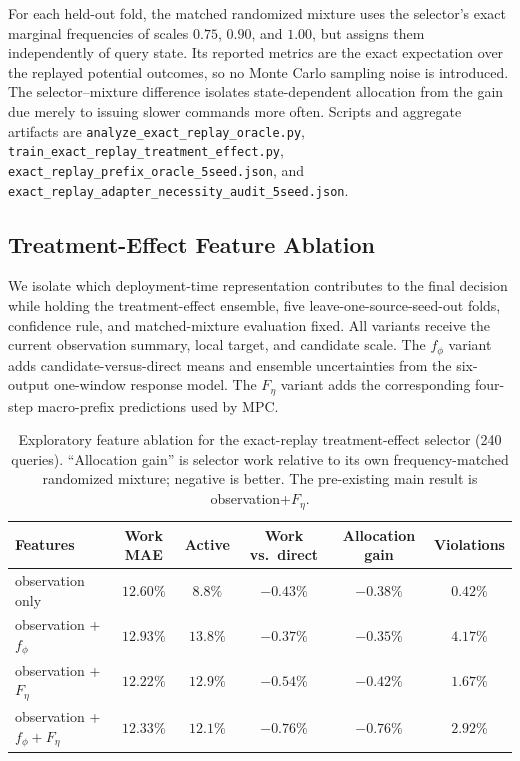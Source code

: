 For each held-out fold, the matched randomized mixture uses the selector's exact
marginal frequencies of scales $0.75$, $0.90$, and $1.00$, but assigns them
independently of query state. Its reported metrics are the exact expectation over
the replayed potential outcomes, so no Monte Carlo sampling noise is introduced.
The selector--mixture difference isolates state-dependent allocation from the
gain due merely to issuing slower commands more often. Scripts and aggregate
artifacts are
\texttt{analyze\_exact\_replay\_oracle.py},
\texttt{train\_exact\_replay\_treatment\_effect.py},
\texttt{exact\_replay\_prefix\_oracle\_5seed.json}, and
\texttt{exact\_replay\_adapter\_necessity\_audit\_5seed.json}.

\subsection{Treatment-Effect Feature Ablation}
\label{app:feature-ablation}

We isolate which deployment-time representation contributes to the final
decision while holding the treatment-effect ensemble, five leave-one-source-seed-out
folds, confidence rule, and matched-mixture evaluation fixed. All variants
receive the current observation summary, local target, and candidate scale.
The $f_\phi$ variant adds candidate-versus-direct means and ensemble
uncertainties from the six-output one-window response model. The $F_\eta$
variant adds the corresponding four-step macro-prefix predictions used by MPC.

\begin{table}[h]
\centering
\caption{Exploratory feature ablation for the exact-replay treatment-effect selector (240 queries). ``Allocation gain'' is selector work relative to its own frequency-matched randomized mixture; negative is better. The pre-existing main result is observation+$F_\eta$.}
\label{tab:feature-ablation}
\begin{tabular}{lccccc}
\toprule
Features & Work MAE & Active & Work vs.\ direct & Allocation gain & Violations \\
\midrule
observation only & $12.60\%$ & $8.8\%$ & $-0.43\%$ & $-0.38\%$ & $0.42\%$ \\
observation + $f_\phi$ & $12.93\%$ & $13.8\%$ & $-0.37\%$ & $-0.35\%$ & $4.17\%$ \\
observation + $F_\eta$ & $\mathbf{12.22\%}$ & $12.9\%$ & $-0.54\%$ & $-0.42\%$ & $1.67\%$ \\
observation + $f_\phi+F_\eta$ & $12.33\%$ & $12.1\%$ & $\mathbf{-0.76\%}$ & $\mathbf{-0.76\%}$ & $2.92\%$ \\
\bottomrule
\end{tabular}
\end{table}

